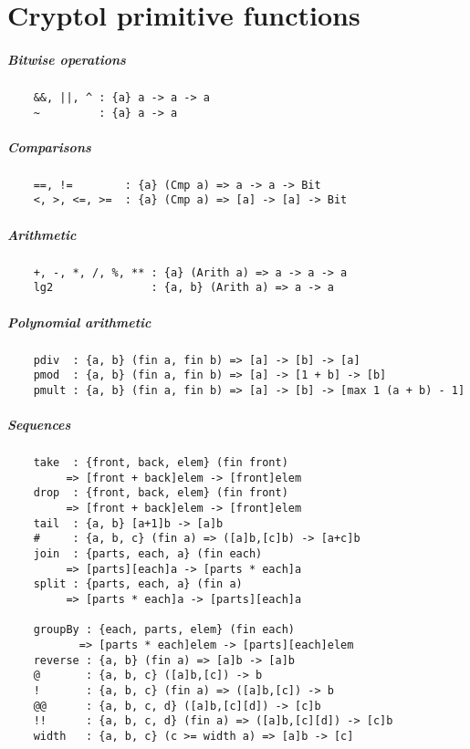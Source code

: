 \chapter{Cryptol primitive functions}


\paragraph*{Bitwise operations}
\begin{Verbatim}
    &&, ||, ^ : {a} a -> a -> a
    ~         : {a} a -> a
\end{Verbatim}
\paragraph*{Comparisons}
\begin{Verbatim}
    ==, !=        : {a} (Cmp a) => a -> a -> Bit
    <, >, <=, >=  : {a} (Cmp a) => [a] -> [a] -> Bit
\end{Verbatim}
\paragraph*{Arithmetic}
\begin{Verbatim}
    +, -, *, /, %, ** : {a} (Arith a) => a -> a -> a
    lg2               : {a, b} (Arith a) => a -> a
\end{Verbatim}
\paragraph*{Polynomial arithmetic}
\begin{Verbatim}
    pdiv  : {a, b} (fin a, fin b) => [a] -> [b] -> [a]
    pmod  : {a, b} (fin a, fin b) => [a] -> [1 + b] -> [b]
    pmult : {a, b} (fin a, fin b) => [a] -> [b] -> [max 1 (a + b) - 1]
\end{Verbatim}
\paragraph*{Sequences}
\begin{Verbatim}
    take  : {front, back, elem} (fin front) 
         => [front + back]elem -> [front]elem
    drop  : {front, back, elem} (fin front) 
         => [front + back]elem -> [front]elem
    tail  : {a, b} [a+1]b -> [a]b
    #     : {a, b, c} (fin a) => ([a]b,[c]b) -> [a+c]b
    join  : {parts, each, a} (fin each) 
         => [parts][each]a -> [parts * each]a
    split : {parts, each, a} (fin a)
         => [parts * each]a -> [parts][each]a

    groupBy : {each, parts, elem} (fin each) 
           => [parts * each]elem -> [parts][each]elem
    reverse : {a, b} (fin a) => [a]b -> [a]b
    @       : {a, b, c} ([a]b,[c]) -> b
    !       : {a, b, c} (fin a) => ([a]b,[c]) -> b
    @@      : {a, b, c, d} ([a]b,[c][d]) -> [c]b
    !!      : {a, b, c, d} (fin a) => ([a]b,[c][d]) -> [c]b
    width   : {a, b, c} (c >= width a) => [a]b -> [c]
\end{Verbatim}
